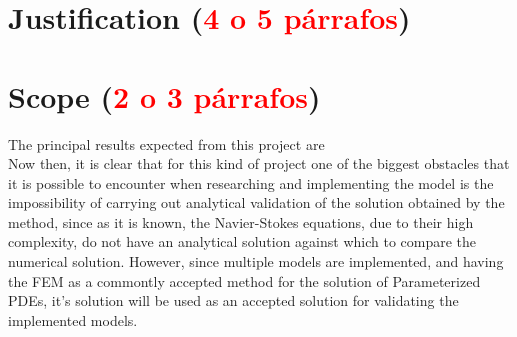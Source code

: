 \documentclass[12pt,letterpaper]{article}
\begin{document}
\section{Justification (\textcolor{red}{4 o 5 párrafos})}

\section{Scope (\textcolor{red}{2 o 3 párrafos})}

The principal results expected from this project are \\

Now then, it is clear that for this kind of project one of the biggest obstacles that it is possible
to encounter when researching and implementing the model is the impossibility of carrying out
analytical validation of the solution obtained by the method, since as it is known, the Navier-Stokes
equations, due to their high complexity, do not have an analytical solution against which to compare
the numerical solution. However, since multiple models are implemented, and having the FEM as a commontly
accepted method for the solution of Parameterized PDEs, it's solution will be used as an accepted solution 
for validating the implemented models. 
\end{document}
